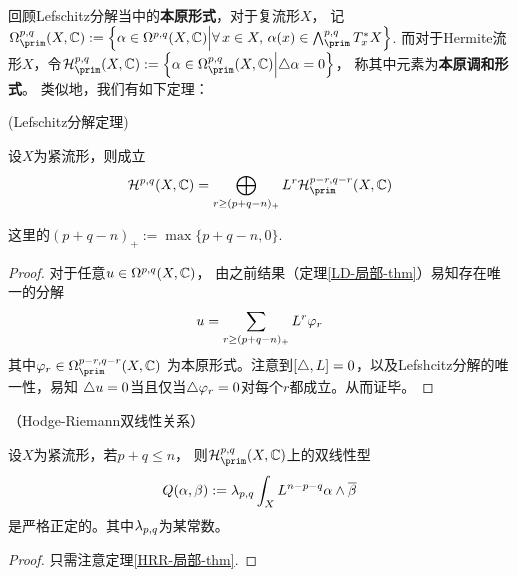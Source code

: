 回顾Lefschitz分解当中的\textbf{本原形式}，对于复流形$X$，
记$\Omg^{p,q}_{\prim}(X,\bbC):=
\Bigset{\afa\in\Omg^{p,q}(X,\bbC)}
{\forall\, x\in X,\,\afa(x)\in\wedgeform{p,q}_{\prim}T^*_xX}$.
而对于Hermite流形$X$，令$\mcalH^{p,q}_{\prim}(X,\bbC):=
\Bigset{\afa\in\Omg^{p,q}_{\prim}(X,\bbC)}{\yc\afa=0}$，
称其中元素为\textbf{本原调和形式}。
类似地，我们有如下定理：


\begin{thm}(Lefschitz分解定理)

设$X$为紧\Kahler 流形，则成立
$$
  \mcalH^{p,q}(X,\bbC)
=
  \bigoplus_{r\geq(p+q-n)_+}
  L^r\mcalH^{p-r,q-r}_{\prim}(X,\bbC)
$$
\end{thm}
这里的$(p+q-n)_+:=\max\{p+q-n,0\}$.

\begin{proof}
对于任意$u\in\Omega^{p,q}(X,\mathbb{C})$，
由之前结果（定理\ref{LD-局部-thm}）易知存在唯一的分解
$$
  u=\sum_{r\geq(p+q-n)_+}L^r\varphi_r
$$
其中$\fai_r\in\Omg^{p-r,q-r}_{\prim}(X,\bbC)$
为本原形式。注意到$[\triangle,L]=0$，以及Lefshcitz分解的唯一性，易知
$\triangle u=0$当且仅当$\triangle\varphi_r=0$对每个$r$都成立。从而证毕。
\end{proof}


\begin{thm}（Hodge-Riemann双线性关系）

设$X$为紧\Kahler 流形，若$p+q\leq n$，
则$\mcalH_{\prim}^{p,q}(X,\bbC)$上的双线性型
$$
  Q(\alpha,\beta)
:=
  \lambda_{p,q}\int_XL^{n-p-q}\alpha\wedge\overline{\beta}
$$
是严格正定的。其中$\lambda_{p,q}$为某常数。
\end{thm}

\begin{proof}
只需注意定理\ref{HRR-局部-thm}.
\end{proof}


